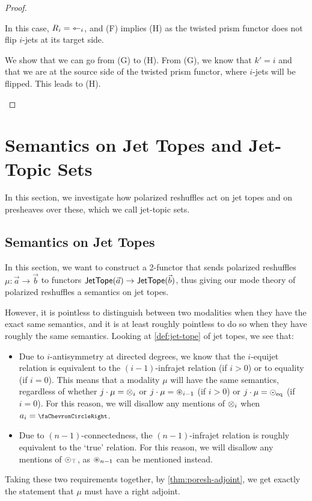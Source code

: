 \documentclass[a4paper]{memoir}
\begin{document}
\begin{proof}
\begin{enumerate}
\begin{itemize}
\begin{itemize}
\begin{description}
\begin{itemize}
\begin{itemize}
\begin{itemize}
								In this case, $R_i = {\leftarrowtriangle}_i$, and (F) implies (H) as the twisted prism functor does not flip $i$-jets at its target side.
							\end{itemize}
						\end{itemize}
					\end{itemize}
					\item[From (G) to (H)]
					We show that we can go from (G) to (H).
					From (G), we know that $k' = i$ and that we are at the source side of the twisted prism functor, where $i$-jets will be flipped.
					This leads to (H). \qedhere
				\end{description}
			\end{itemize}
		\end{itemize}
	\end{enumerate}
\end{proof}



\section{Semantics on Jet Topes and Jet-Topic Sets} \label{sec:poresh-jettope-jtset}
In this section, we investigate how polarized reshuffles act on jet topes and on presheaves over these, which we call jet-topic sets.

\subsection{Semantics on Jet Topes} \label{sec:poresh-jettope}
In this section, we want to construct a 2-functor that sends polarized reshuffles $\mu : \vec a \to \vec b$ to functors $\mathsf{JetTope}(\vec a) \to \mathsf{JetTope}(\vec b)$, thus giving our mode theory of polarized reshuffles a semantics on jet topes.

However, it is pointless to distinguish between two modalities when they have the exact same semantics, and it is at least roughly pointless to do so when they have roughly the same semantics.
Looking at \cref{def:jet-tope} of jet topes, we see that:
\begin{itemize}
	\item Due to $i$-antisymmetry at directed degrees, we know that the $i$-equijet relation is equivalent to the $(i-1)$-infrajet relation (if $i > 0$) or to equality (if $i = 0$).
	This means that a modality $\mu$ will have the same semantics, regardless of whether $j \cdot \mu = {\otimes}_i$ or $j \cdot \mu = {\oast}_{i-1}$ (if $i > 0$) or $j \cdot \mu = {\odot}_{\mathrm{eq}}$ (if $i = 0$).
	For this reason, we will disallow any mentions of ${\otimes}_i$ when $a_i = \ypolar$.
	
	\item Due to $(n-1)$-connectedness, the $(n-1)$-infrajet relation is roughly equivalent to the `true' relation.
	For this reason, we will disallow any mentions of ${\odot}_\top$, as ${\oast}_{n-1}$ can be mentioned instead.
\end{itemize}
Taking these two requirements together, by \cref{thm:poresh-adjoint}, we get exactly the statement that $\mu$ must have a right adjoint.
\end{document}
